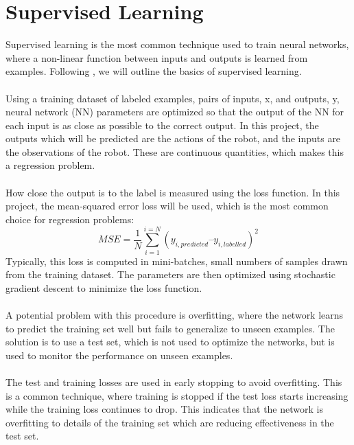 \section{Supervised Learning}
Supervised learning is the most common technique used to train neural networks, where a non-linear function between inputs and outputs is learned from examples. Following \citep{lapan}, we will outline the basics of supervised learning.
\\\\\noindent 
Using a training dataset of labeled examples, pairs of inputs, x, and outputs, y, neural network (NN) parameters are optimized so that the output of the NN for each input is as close as possible to the correct output. In this project, the outputs which will be predicted are the actions of the robot, and the inputs are the observations of the robot. These are continuous quantities, which makes this a regression problem.
\\\\\noindent 
How close the output is to the label is measured using the loss function. In this project, the mean-squared error loss will be used, which is the most common choice for regression problems:
\[MSE = \dfrac{1}{N}\sum_{i=1}^{i=N}(y_{i, predicted} – y_{i, labelled})^2\]
Typically, this loss is computed in mini-batches, small numbers of samples drawn from the training dataset. The parameters are then optimized using stochastic gradient descent to minimize the loss function.
\\\\\noindent 
A potential problem with this procedure is overfitting, where the network learns to predict the training set well but fails to generalize to unseen examples. The solution is to use a test set, which is not used to optimize the networks, but is used to monitor the performance on unseen examples.
\\\\\noindent 
The test and training losses are used in early stopping to avoid overfitting. This is a common technique, where training is stopped if the test loss starts increasing while the training loss continues to drop. This indicates that the network is overfitting to details of the training set which are reducing effectiveness in the test set.
